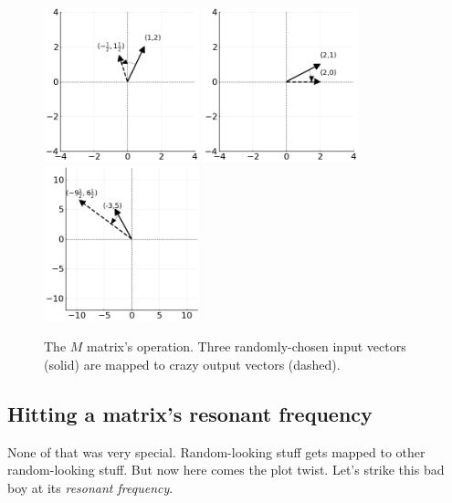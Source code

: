 \begin{figure}[ht]
\centering
\includegraphics[width=0.4\textwidth]{crazytrans1.png} \quad
\includegraphics[width=0.4\textwidth]{crazytrans2.png} \\
\smallskip
\includegraphics[width=0.4\textwidth]{crazytrans3.png}
\caption{The $M$ matrix's operation. Three randomly-chosen input vectors
(solid) are mapped to crazy output vectors (dashed).}
\label{nonEigenvec}
\end{figure}


\subsection{Hitting a matrix's resonant frequency}

None of that was very special. Random-looking stuff gets mapped to other
random-looking stuff. But now here comes the plot twist. Let's strike this bad
boy at its \textit{resonant frequency}.

